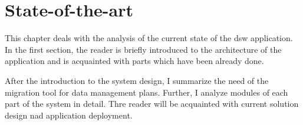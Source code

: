 \chapter{State-of-the-art}

This chapter deals with the analysis of the current state of the \gls{dsw} application.
In the first section, the reader is briefly introduced to the architecture of the application and is acquainted with parts which have been already done.

After the introduction to the system design, I summarize the need of the migration tool for data management plans.
Further, I analyze modules of each part of the system in detail.
Thre reader will be acquainted with current solution design nad application deployment.









